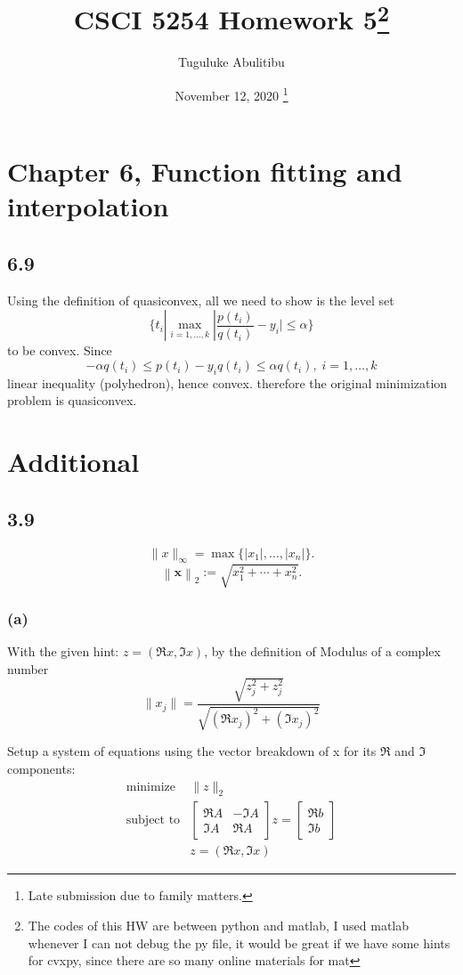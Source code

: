 \documentclass{article}
\title{CSCI 5254  Homework 5\footnote{The codes of this HW are between python and matlab, I used matlab whenever I can not debug the py file, it would be great if we have some hints for cvxpy, since there are so many online materials for mat}}
\author{Tuguluke Abulitibu}
\date{November 12, 2020 \footnote{Late submission due to family matters.}}
\begin{document}
\maketitle %
\section*{Chapter 6, Function fitting and interpolation}	
\subsection*{6.9}
Using the definition of quasiconvex, all we need to show is the level set 
\[\{t_i| \max_{i=1,\dots,k}|\dfrac{p(t_i)}{q(t_i)} - y_i| \le \alpha\}\]
to be convex. Since 
\[-\alpha q(t_i) \le p(t_i)  - y_i q(t_i)\le \alpha q(t_i), \; i = 1, \dots, k\]
linear inequality (polyhedron), hence convex. therefore the original minimization problem is quasiconvex.
\section*{Additional}
 \subsection*{3.9}
 \[\|x\|_{\infty }=\max\{|x_{1}|,\dots ,|x_{n}|\}.\]
 \[{\left\|{\boldsymbol {x}}\right\|_{2}:={\sqrt {x_{1}^{2}+\cdots +x_{n}^{2}}}.}\]
 \subsubsection*{(a)}
 With the given hint: $z = (\Re x, \Im x)$, by the definition of Modulus of a complex number 
\[\|x_j\|  = \dfrac{\sqrt{z_j^2 + z_j^2 }}{\sqrt{(\Re x_j)^2  + (\Im x_j)^2}}\]

Setup a system of equations using the vector breakdown of x for its $\Re$ and $\Im$ components:
     \[  \boxed{  \begin{array}{ll}
    \mbox{minimize}   & \|z\|_2  \\
    \mbox{subject to} & \begin{bmatrix}
\Re A & -\Im A\\
\Im A & \Re A
\end{bmatrix}
z=
\begin{bmatrix}
\Re b\\
\Im b
\end{bmatrix}\\
& z = (\Re x, \Im x)
   
         \end{array} 
         }
  \]    
\end{document}
